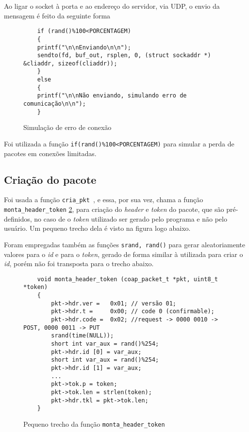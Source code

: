 Ao ligar o socket à porta e ao endereço do servidor, via UDP, o envio da mensagem é feito da seguinte forma

\begin{figure}[!htb]
	\begin{lstlisting}
	if (rand()%100<PORCENTAGEM)
	{
	printf("\n\nEnviando\n\n");
	sendto(fd, buf_out, rsplen, 0, (struct sockaddr *) &cliaddr, sizeof(cliaddr));
	}
	else
	{
	printf("\n\nNão enviando, simulando erro de comunicação\n\n");
	}    
	\end{lstlisting}
	\caption{Simulação de erro de conexão}
	\label{code:simulacao_erro_conexao}
\end{figure}

Foi utilizada a função \texttt{if(rand()\%100<PORCENTAGEM)} para simular a perda de pacotes em conexões limitadas.


\subsection{Criação do pacote}

Foi usada a função \texttt{cria\_pkt }, e essa, por sua vez, chama a função  \texttt{monta\_header\_token} \ref{code:monta_header_token}, para criação do \textit{header} e \textit{token} do pacote, que são pré-definidos, no caso de o \textit{token} utilizado ser gerado pelo programa e não pelo usuário. Um pequeno trecho dela é visto na figura logo abaixo.

Foram empregadas também as funções \texttt{srand, rand()} para gerar aleatoriamente valores para o \textit{id} e para o \textit{token}, gerado de forma similar à utilizada para criar o \textit{id}, porém não foi transposta para o trecho abaixo.

\begin{figure}[!htb]
	\begin{lstlisting}
	void monta_header_token (coap_packet_t *pkt, uint8_t *token)
	{
		pkt->hdr.ver = 	 0x01; // versão 01;
		pkt->hdr.t = 	 0x00; // code 0 (confirmable);
		pkt->hdr.code =  0x02; //request -> 0000 0010 -> POST, 0000 0011 -> PUT
		srand(time(NULL));
		short int var_aux = rand()%254;
		pkt->hdr.id [0] = var_aux;
		short int var_aux = rand()%254;
		pkt->hdr.id [1] = var_aux;
		...
		pkt->tok.p = token;
		pkt->tok.len = strlen(token);
		pkt->hdr.tkl = pkt->tok.len;
	}
	\end{lstlisting}
	\caption{Pequeno trecho da função \texttt{monta\_header\_token}}
	\label{code:monta_header_token}
\end{figure} 


